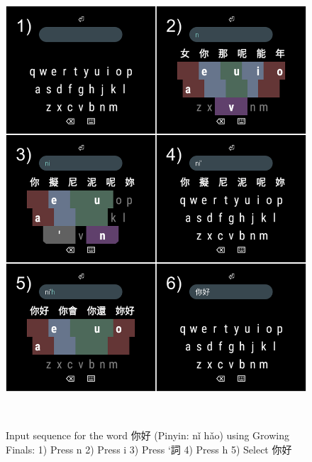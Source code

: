 \begin{figure}
  \centering
  \includegraphics[width=1\columnwidth]{figures/sequence_GrowingFinals}
  \caption{Input sequence for the word 你好 (Pinyin: nǐ hǎo) using Growing Finals: 1) Press n 2) Press i 3) Press ‘詞 4) Press h 5) Select 你好}~\label{fig:figure2}
\end{figure}






